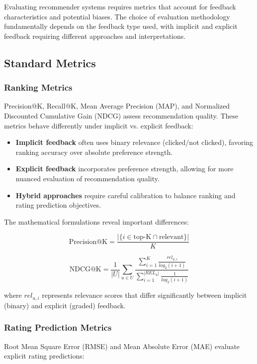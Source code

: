 \documentclass[acmsmall,review,anonymous]{acmart}
\begin{document}
Evaluating recommender systems requires metrics that account for feedback characteristics and potential biases. The choice of evaluation methodology fundamentally depends on the feedback type used, with implicit and explicit feedback requiring different approaches and interpretations.

\subsection{Standard Metrics}

\subsubsection{Ranking Metrics}
Precision@K, Recall@K, Mean Average Precision (MAP), and Normalized Discounted Cumulative Gain (NDCG) assess recommendation quality. These metrics behave differently under implicit vs. explicit feedback:

\begin{itemize}
    \item \textbf{Implicit feedback} often uses binary relevance (clicked/not clicked), favoring ranking accuracy over absolute preference strength.
    \item \textbf{Explicit feedback} incorporates preference strength, allowing for more nuanced evaluation of recommendation quality.
    \item \textbf{Hybrid approaches} require careful calibration to balance ranking and rating prediction objectives.
\end{itemize}

The mathematical formulations reveal important differences:

\begin{equation}
\text{Precision@K} = \frac{|\{i \in \text{top-K} \cap \text{relevant}\}|}{K}
\label{eq:precision_k}
\end{equation}

\begin{equation}
\text{NDCG@K} = \frac{1}{|U|} \sum_{u \in U} \frac{\sum_{i=1}^K \frac{rel_{u,i}}{log_2(i+1)}}{\sum_{i=1}^{|REL_u|} \frac{1}{log_2(i+1)}}
\label{eq:ndcg_k}
\end{equation}

where $rel_{u,i}$ represents relevance scores that differ significantly between implicit (binary) and explicit (graded) feedback.

\subsubsection{Rating Prediction Metrics}
Root Mean Square Error (RMSE) and Mean Absolute Error (MAE) evaluate explicit rating predictions:
\end{document}
